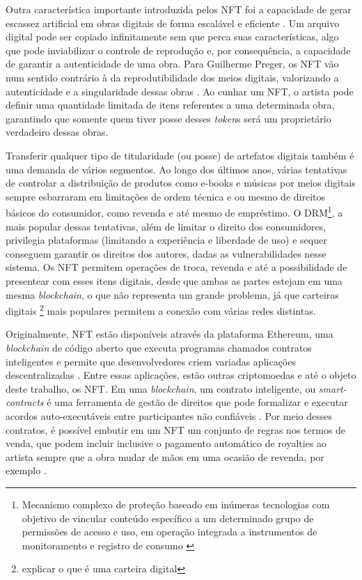 Outra característica importante introduzida pelos NFT foi a capacidade de gerar escassez artificial em obras digitais de forma escalável e eficiente \cite{Kugler}. Um arquivo digital pode ser copiado infinitamente sem que perca suas características, algo que pode inviabilizar o controle de reprodução e, por consequência, a capacidade de garantir a autenticidade de uma obra. Para Guilherme Preger, os NFT vão num sentido contrário à da reprodutibilidade dos meios digitais, valorizando a autenticidade e a singularidade dessas obras \cite{Preger}. Ao cunhar um NFT, o artista pode definir uma quantidade limitada de itens referentes a uma determinada obra, garantindo que somente quem tiver posse desses \textit{token}s será um proprietário verdadeiro dessas obras. 

Transferir qualquer tipo de titularidade (ou posse) de artefatos digitais também é uma demanda de vários segmentos. Ao longo dos últimos anos, várias tentativas de controlar a distribuição de produtos como e-books e músicas por meios digitais sempre esbarraram em limitações de ordem técnica e ou mesmo de direitos básicos do consumidor, como revenda e até mesmo de empréstimo. O DRM\footnote{Mecanismo complexo de proteção baseado em inúmeras tecnologias com objetivo de vincular conteúdo específico a um determinado grupo de permissões de acesso e uso, em operação integrada a instrumentos de monitoramento e registro de consumo \cite{Vieira}}, a mais popular dessas tentativas, além de limitar o direito dos consumidores, privilegia plataformas (limitando a experiência e liberdade de uso) e sequer conseguem garantir os direitos dos autores, dadas as vulnerabilidades nesse sistema. Os NFT permitem operações de troca, revenda e até a possibilidade de presentear com esses itens digitais, desde que ambas as partes estejam em uma mesma \textit{blockchain}, o que não representa um grande problema, já que carteiras digitais \footnote{explicar o que é uma carteira digital} mais populares permitem a conexão com várias redes distintas. 

Originalmente, NFT estão disponíveis através da plataforma Ethereum, uma \textit{blockchain} de código aberto que executa programas chamados contratos inteligentes e permite que desenvolvedores criem variadas aplicações descentralizadas \cite{Antonopoulos}. Entre essas aplicações, estão outras criptomoedas e até o objeto deste trabalho, os NFT. Em uma \textit{blockchain}, um contrato inteligente, ou \textit{smart-contracts} é uma ferramenta de gestão de direitos que pode formalizar e executar acordos auto-executáveis entre participantes não confiáveis \cite{Voshmgir}. Por meio desses contratos, é possível embutir em um NFT um conjunto de regras nos termos de venda, que podem incluir inclusive o pagamento automático de royalties ao artista sempre que a obra mudar de mãos em uma ocasião de revenda, por exemplo \cite{Kugler}.













